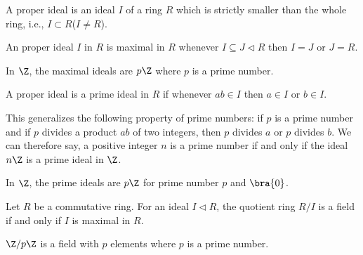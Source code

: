 \begin{definition}\label{def:proper_ideal}
A proper ideal is an ideal $I$ of a ring $R$ which is strictly smaller than the whole ring, i.e., $I\subset R$($I\neq R$).
\end{definition}

\begin{definition}
An proper ideal $I$ in $R$ is maximal in $R$ whenever $I \subseteq J \lhd R$ then $I = J$ or $J = R$.
\end{definition}

\begin{example}
In $\Z$, the maximal ideals are $p\Z$ where $p$ is a prime number.
\end{example}


\begin{definition}\label{def:prime_ideal}
A proper ideal is a prime ideal in $R$ if whenever $ab \in I$ then $a \in I$ or $b \in I$.
\end{definition}

\begin{remark}
This generalizes the following property of prime numbers: if $p$ is a prime number and if $p$ divides a product $ab$ of two integers, then $p$ divides $a$ or $p$ divides $b$. We can therefore say, a positive integer $n$ is a prime number if and only if the ideal $n\Z$ is a prime ideal in $\Z$.
\end{remark}

\begin{example}
In $\Z$, the prime ideals are $p\Z$ for prime number $p$ and $\bra{0}$.
\end{example}

\begin{lemma}\label{lem:field_maximal_ideal}
Let $R$ be a commutative ring. For an ideal $I \lhd R$, the quotient ring $R/I$ is a field if and only if $I$ is maximal in $R$.
\end{lemma}

\begin{example}\label{exa:zpz_field}
$\Z/p\Z$ is a field with $p$ elements where $p$ is a prime number.
\end{example}


